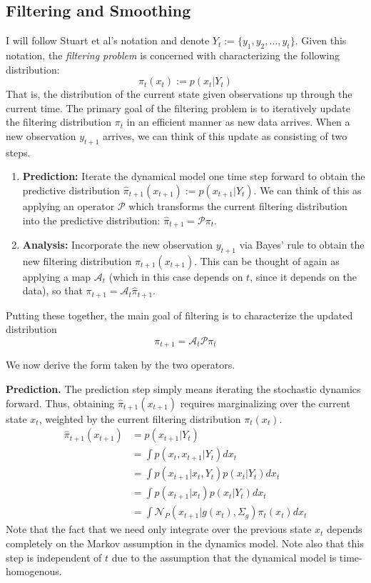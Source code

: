 \documentclass[12pt]{article}
\begin{document}
\subsection{Filtering and Smoothing}
I will follow Stuart et al's notation and denote $Y_t := \{y_1, y_2, \dots, y_t\}$. Given this notation, the \textit{filtering problem} is concerned with characterizing the following distribution:
\[\pi_{t}(x_t) := p(x_t|Y_t)\]
That is, the distribution of the current state given observations up through the current time. The primary goal of the filtering problem is to iteratively update the filtering distribution $\pi_t$ in 
an efficient manner as new data arrives. When a new observation $y_{t + 1}$ arrives, we can think of this update as consisting of two steps. 
\begin{enumerate}
\item \textbf{Prediction:} Iterate the dynamical model one time step forward to obtain the predictive distribution $\hat{\pi}_{t+1}(x_{t+1}) := p(x_{t+1}|Y_t)$. We can think of this as applying 
an operator $\mathcal{P}$ which transforms the current filtering distribution into the predictive distribution: $\hat{\pi}_{t+1} = \mathcal{P}\pi_t$. 
\item \textbf{Analysis:} Incorporate the new observation $y_{t+1}$ via Bayes' rule to obtain the new filtering distribution $\pi_{t+1}(x_{t+1})$. This can be thought of again as 
applying a map $\mathcal{A}_t$ (which in this case depends on $t$, since it depends on the data), so that $\pi_{t + 1} = \mathcal{A}_t \hat{\pi}_{t+1}$. 
\end{enumerate}
Putting these together, the main goal of filtering is to characterize the updated distribution 
\[\pi_{t + 1} = \mathcal{A}_t \mathcal{P} \pi_t \]

We now derive the form taken by the two operators. 

\bigskip
\noindent
\textbf{Prediction.} The prediction step simply means iterating the stochastic dynamics forward. Thus, obtaining $\hat{\pi}_{t+1}(x_{t+1})$ requires marginalizing 
over the current state $x_t$, weighted by the current filtering distribution $\pi_t(x_t)$. 
\begin{align}
\hat{\pi}_{t+1}(x_{t+1}) &= p(x_{t+1}|Y_t) \nonumber \\
				   &= \int p(x_t, x_{t+1}|Y_t) dx_t \nonumber \\ 
				   &= \int p(x_{t+1}|x_t, Y_t) p(x_t|Y_t) dx_t \nonumber \\
				   &= \int p(x_{t+1}|x_t) p(x_t|Y_t) dx_t \nonumber \\
				   &= \int \mathcal{N}_P(x_{t+1}|g(x_t), \Sigma_g) \pi_t(x_t) dx_t \label{prediction_operator}
\end{align}
Note that the fact that we need only integrate over the previous state $x_t$ depends completely on the Markov assumption in the dynamics model. Note also that this 
step is independent of $t$ due to the assumption that the dynamical model is time-homogenous. 
\end{document}
